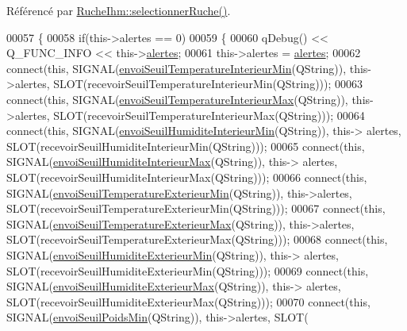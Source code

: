Référencé par \hyperlink{class_ruche_ihm_a7324ae6ea574ccdad47783f466933157}{Ruche\+Ihm\+::selectionner\+Ruche()}.


\begin{DoxyCode}
00057 \{
00058     \textcolor{keywordflow}{if}(this->alertes == 0)
00059     \{
00060         qDebug() << Q\_FUNC\_INFO << this->\hyperlink{class_reglages_alertes_ihm_a9afa97e737d3c6a9a28a23fc4bc4beeb}{alertes};
00061         this->alertes = \hyperlink{class_reglages_alertes_ihm_a9afa97e737d3c6a9a28a23fc4bc4beeb}{alertes};
00062         connect(\textcolor{keyword}{this}, SIGNAL(\hyperlink{class_reglages_alertes_ihm_a44b51f5bfba7a28ee82b5e08d042c153}{envoiSeuilTemperatureInterieurMin}(QString)), 
      this->alertes, SLOT(recevoirSeuilTemperatureInterieurMin(QString)));
00063         connect(\textcolor{keyword}{this}, SIGNAL(\hyperlink{class_reglages_alertes_ihm_aa2695b931056a81e6e33ae5e9867b872}{envoiSeuilTemperatureInterieurMax}(QString)), 
      this->alertes, SLOT(recevoirSeuilTemperatureInterieurMax(QString)));
00064         connect(\textcolor{keyword}{this}, SIGNAL(\hyperlink{class_reglages_alertes_ihm_a0d913b26dd22ce48aaebed82a0d3df62}{envoiSeuilHumiditeInterieurMin}(QString)), this->
      alertes, SLOT(recevoirSeuilHumiditeInterieurMin(QString)));
00065         connect(\textcolor{keyword}{this}, SIGNAL(\hyperlink{class_reglages_alertes_ihm_ae5e409ea2353cc8e43f312e252b365f9}{envoiSeuilHumiditeInterieurMax}(QString)), this->
      alertes, SLOT(recevoirSeuilHumiditeInterieurMax(QString)));
00066         connect(\textcolor{keyword}{this}, SIGNAL(\hyperlink{class_reglages_alertes_ihm_a5c4cadb3f7a76cecc0bafaa297b2898a}{envoiSeuilTemperatureExterieurMin}(QString)), 
      this->alertes, SLOT(recevoirSeuilTemperatureExterieurMin(QString)));
00067         connect(\textcolor{keyword}{this}, SIGNAL(\hyperlink{class_reglages_alertes_ihm_a626e1067d882bb5c0b86c8e0fb063dcc}{envoiSeuilTemperatureExterieurMax}(QString)), 
      this->alertes, SLOT(recevoirSeuilTemperatureExterieurMax(QString)));
00068         connect(\textcolor{keyword}{this}, SIGNAL(\hyperlink{class_reglages_alertes_ihm_a78cef50cbaaaa46c837230024129c092}{envoiSeuilHumiditeExterieurMin}(QString)), this->
      alertes, SLOT(recevoirSeuilHumiditeExterieurMin(QString)));
00069         connect(\textcolor{keyword}{this}, SIGNAL(\hyperlink{class_reglages_alertes_ihm_a1455ae71d0e6c33b7857a23d116f3248}{envoiSeuilHumiditeExterieurMax}(QString)), this->
      alertes, SLOT(recevoirSeuilHumiditeExterieurMax(QString)));
00070         connect(\textcolor{keyword}{this}, SIGNAL(\hyperlink{class_reglages_alertes_ihm_a6d4642c0f64bad9f070ce7988549f8df}{envoiSeuilPoidsMin}(QString)), this->alertes, SLOT(

\end{DoxyCode}
